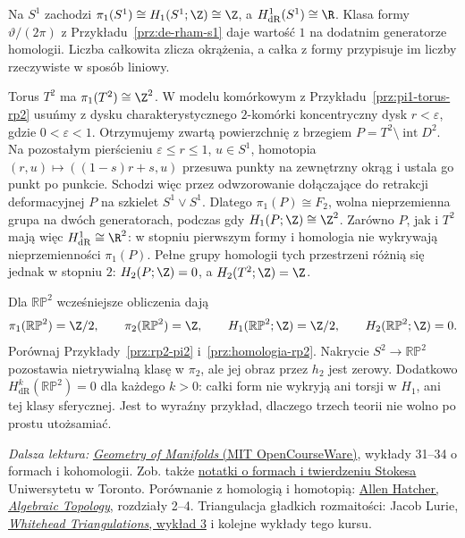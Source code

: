 \begin{przyklad}
Na $S^1$ zachodzi
$\pi_1(S^1)\cong H_1(S^1;\Z)\cong\Z$,
a $H^1_{\mathrm{dR}}(S^1)\cong\R$.
Klasa formy $\vartheta/(2\pi)$ z
Przykładu~\ref{prz:de-rham-s1} daje wartość
$1$ na dodatnim generatorze homologii.
Liczba całkowita zlicza okrążenia, a całka
z formy przypisuje im liczby rzeczywiste
w sposób liniowy.
\end{przyklad}

\begin{przyklad}
Torus $T^2$ ma $\pi_1(T^2)\cong\Z^2$.
W modelu komórkowym z Przykładu~\ref{prz:pi1-torus-rp2}
usuńmy z dysku charakterystycznego $2$-komórki
koncentryczny dysk $r<\varepsilon$, gdzie $0<\varepsilon<1$.
Otrzymujemy zwartą powierzchnię z brzegiem
$P=T^2\setminus\operatorname{int}D^2$.
Na pozostałym pierścieniu $\varepsilon\leq r\leq1$,
$u\in S^1$, homotopia $(r,u)\mapsto((1-s)r+s,u)$
przesuwa punkty na zewnętrzny okrąg i ustala go punkt po punkcie.
Schodzi więc przez odwzorowanie dołączające do retrakcji
deformacyjnej $P$ na szkielet $S^1\vee S^1$.
Dlatego $\pi_1(P)\cong F_2$, wolna
nieprzemienna grupa na dwóch generatorach,
podczas gdy $H_1(P;\Z)\cong\Z^2$.
Zarówno $P$, jak i $T^2$ mają więc
$H^1_{\mathrm{dR}}\cong\R^2$:
w stopniu pierwszym formy i homologia
nie wykrywają nieprzemienności $\pi_1(P)$.
Pełne grupy homologii tych przestrzeni
różnią się jednak w stopniu $2$:
$H_2(P;\Z)=0$, a $H_2(T^2;\Z)=\Z$.
\end{przyklad}

\begin{przyklad}
Dla $\mathbb{RP}^2$ wcześniejsze obliczenia dają
\[
 \pi_1(\mathbb{RP}^2)=\Z/2,\qquad
 \pi_2(\mathbb{RP}^2)=\Z,\qquad
 H_1(\mathbb{RP}^2;\Z)=\Z/2,\qquad
 H_2(\mathbb{RP}^2;\Z)=0.
\]
Porównaj Przykłady~\ref{prz:rp2-pi2}
i~\ref{prz:homologia-rp2}. Nakrycie
$S^2\to\mathbb{RP}^2$ pozostawia nietrywialną
klasę w $\pi_2$, ale jej obraz przez $h_2$
jest zerowy. Dodatkowo
$H^k_{\mathrm{dR}}(\mathbb{RP}^2)=0$
dla każdego $k>0$: całki form nie wykryją
ani torsji w $H_1$, ani tej klasy sferycznej.
Jest to wyraźny przykład, dlaczego trzech teorii
nie wolno po prostu utożsamiać.
\end{przyklad}

\par\smallskip
{\footnotesize\noindent\emph{Dalsza lektura:}
\href{https://ocw.mit.edu/courses/18-965-geometry-of-manifolds-fall-2004/pages/lecture-notes/}
{\emph{Geometry of Manifolds} (MIT OpenCourseWare)},
wykłady 31--34 o formach i kohomologii.
Zob. także \href{https://www.math.toronto.edu/mgualt/courses/17-1300/docs/17-1300-notes-13.pdf}
{notatki o formach i twierdzeniu Stokesa}
Uniwersytetu w Toronto.
Porównanie z homologią i homotopią:
\href{https://pi.math.cornell.edu/~hatcher/AT/AT.pdf}
{Allen Hatcher, \emph{Algebraic Topology}},
rozdziały 2--4. Triangulacja gładkich rozmaitości: Jacob Lurie,
\href{https://www.math.ias.edu/~lurie/937notes/937Lecture3.pdf}
{\emph{Whitehead Triangulations}, wykład 3} i kolejne
wykłady tego kursu.\par}
